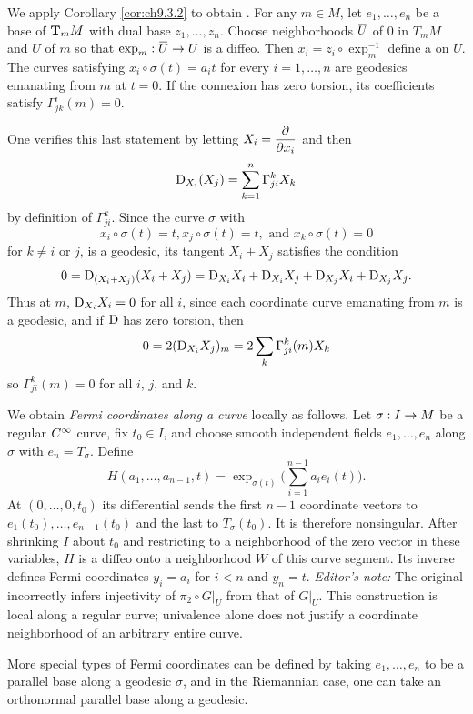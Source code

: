\documentclass[../main]{subfiles}
\begin{document}
We apply Corollary \ref{cor:ch9.3.2} to obtain . For any $m\in M$, let $e_1,\dots,e_n$ be a base of $\tangentspace{M}{m}$ with dual base $z_1,\dots,z_n$. Choose neighborhoods $\xoverline U$ of $0$ in $T_mM$ and $U$ of $m$ so that $\exp_m:\xoverline U\functionMaps U$ is a diffeo. Then $x_i=z_i\circ\exp_m^{-1}$ define a  on $U$. The curves satisfying $x_i\circ\sigma(t)=a_it$ for every $i=1,\dots,n$ are geodesics emanating from $m$ at $t=0$. If the connexion has zero torsion, its coefficients satisfy $\Gamma_{jk}^i(m)=0$.

One verifies this last statement by letting $X_i = \pdv{}{x_i}$ and then \[\D_{X_i}(X_j) = \sum_{k=1}^n \Gamma_{ji}^k X_k\] by definition of $\Gamma_{ji}^k$. Since the curve $\sigma$ with \[x_i \circ \sigma(t) = t, x_j\circ \sigma(t) = t,\text{ and }x_k \circ \sigma(t) = 0\] for $k\ne i$ or $j$, is a geodesic, its tangent $X_i + X_j$ satisfies the condition 
\[ 0 = \D_{(X_i + X_j)}(X_i + X_j) = \D_{X_i} X_i + \D_{X_i} X_j + \D_{X_j} X_i + \D_{X_j} X_j.\]
Thus at $m$, $\D_{X_i}X_i = 0$ for all $i$, since each coordinate curve emanating from $m$ is a geodesic, and if $\D$ has zero torsion, then \[0 = 2(\D_{X_i} X_j)_m = 2\sum_k \Gamma_{ji}^k (m) X_k\] so $\Gamma_{ji}^k(m) = 0$ for all $i$, $j$, and $k$.

We obtain \emph{Fermi coordinates along a curve} locally as follows. Let $\sigma:I\functionMaps M$ be a regular $\CInfty$ curve, fix $t_0\in I$, and choose smooth independent fields $e_1,\dots,e_n$ along $\sigma$ with $e_n=T_\sigma$. Define
\[H(a_1,\dots,a_{n-1},t)=\exp_{\sigma(t)}\Big(\sum_{i=1}^{n-1}a_ie_i(t)\Big).\]
At $(0,\dots,0,t_0)$ its differential sends the first $n-1$ coordinate vectors to $e_1(t_0),\dots,e_{n-1}(t_0)$ and the last to $T_\sigma(t_0)$. It is therefore nonsingular. After shrinking $I$ about $t_0$ and restricting to a neighborhood of the zero vector in these variables, $H$ is a diffeo onto a neighborhood $W$ of this curve segment. Its inverse defines Fermi coordinates $y_i=a_i$ for $i<n$ and $y_n=t$. \emph{Editor's note:} The original incorrectly infers injectivity of $\pi_2\circ G|_U$ from that of $G|_U$. This construction is local along a regular curve; univalence alone does not justify a coordinate neighborhood of an arbitrary entire curve.

More special types of Fermi coordinates can be defined by taking $e_1,\dots,e_n$ to be a parallel base along a geodesic $\sigma$, and in the Riemannian case, one can take an orthonormal parallel base along a geodesic.
\end{document}
